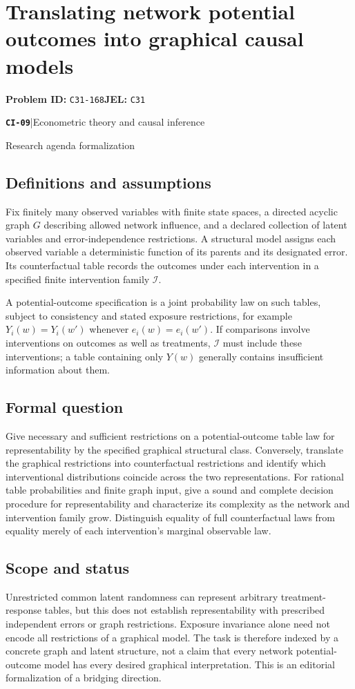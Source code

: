 \documentclass[11pt,a4paper]{article}
\newcommand{\entrymeta}[3]{{\sffamily\small\color{muted}\textbf{\texttt{#1}}\quad|\quad #2\par #3\par}}
\begin{document}
\section*{Translating network potential outcomes into graphical causal models}
\textbf{Problem ID:} \texttt{C31-168}\quad \textbf{JEL:} \texttt{C31}\par
\label{problem:OP-0488}
\label{beyond:CI-09}
\entrymeta{CI-09}{Econometric theory and causal inference}{Research agenda formalization}
\subsection*{Definitions and assumptions}
Fix finitely many observed variables with finite state spaces, a directed acyclic graph $G$ describing allowed network influence, and a declared collection of latent variables and error-independence restrictions. A structural model assigns each observed variable a deterministic function of its parents and its designated error. Its counterfactual table records the outcomes under each intervention in a specified finite intervention family $\mathcal I$.

A potential-outcome specification is a joint probability law on such tables, subject to consistency and stated exposure restrictions, for example $Y_i(w)=Y_i(w')$ whenever $e_i(w)=e_i(w')$. If comparisons involve interventions on outcomes as well as treatments, $\mathcal I$ must include these interventions; a table containing only $Y(w)$ generally contains insufficient information about them.
\subsection*{Formal question}
Give necessary and sufficient restrictions on a potential-outcome table law for representability by the specified graphical structural class. Conversely, translate the graphical restrictions into counterfactual restrictions and identify which interventional distributions coincide across the two representations. For rational table probabilities and finite graph input, give a sound and complete decision procedure for representability and characterize its complexity as the network and intervention family grow. Distinguish equality of full counterfactual laws from equality merely of each intervention's marginal observable law.
\subsection*{Scope and status}
Unrestricted common latent randomness can represent arbitrary treatment-response tables, but this does not establish representability with prescribed independent errors or graph restrictions. Exposure invariance alone need not encode all restrictions of a graphical model. The task is therefore indexed by a concrete graph and latent structure, not a claim that every network potential-outcome model has every desired graphical interpretation. This is an editorial formalization of a bridging direction.
\end{document}
